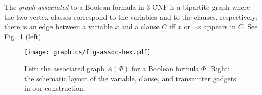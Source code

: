 The \emph{graph associated} to a Boolean formula in 3-CNF is a bipartite graph where the two vertex classes correspond to the variables and to the clauses, respectively; there is an edge between a variable $x$ and a clause $C$ iff $x$ or $\neg x$ appears in $C$. See Fig.~\ref{fig:assoc} (left).


\begin{figure}[!htbp]
	\centering
	\texttt{[image: graphics/fig-assoc-hex.pdf]}
	\caption[]{Left: the associated graph $A(\Phi)$ for a Boolean formula $\Phi$.
Right: the schematic layout of the variable, clause, and transmitter gadgets in our construction.}
	\label{fig:assoc}
\end{figure}